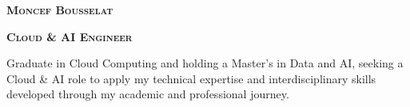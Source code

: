 \documentclass[letterpaper,12t]{article}
\begin{document}

\begin{center}
    \begin{minipage}[c]{0.17\textwidth}
        \centering
        \setlength{\fboxsep}{0.1pt}
        \setlength{\fboxrule}{2pt}
    \end{minipage}
    \hfill
    \begin{minipage}[c]{0.8\textwidth}
        \textbf{\LARGE \scshape Moncef Bousselat}
        \vspace{3pt}
    
        \textbf{\large \scshape Cloud \& AI Engineer}
        \vspace{5pt}

        \begin{minipage}{\textwidth}
            \justifying \small \noindent
            Graduate in Cloud Computing and holding a Master's in Data and AI, seeking a
            Cloud \& AI role to apply my technical expertise and interdisciplinary 
            skills developed through my academic and professional journey.
        \end{minipage}


\end{minipage}
\end{center}
\end{document}
